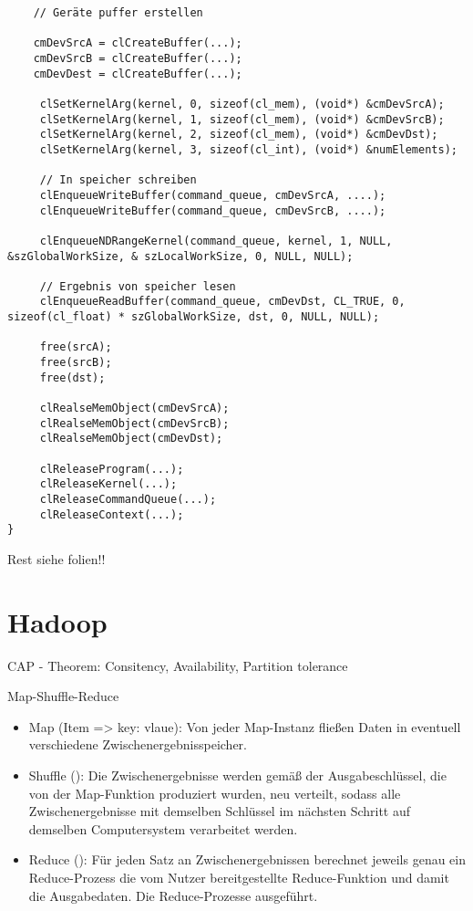 \documentclass{article}
\begin{document}
\begin{multicols}{2}
\begin{verbatim}
    // Geräte puffer erstellen
    
    cmDevSrcA = clCreateBuffer(...);
    cmDevSrcB = clCreateBuffer(...);
    cmDevDest = clCreateBuffer(...);
    
     clSetKernelArg(kernel, 0, sizeof(cl_mem), (void*) &cmDevSrcA);
     clSetKernelArg(kernel, 1, sizeof(cl_mem), (void*) &cmDevSrcB);
     clSetKernelArg(kernel, 2, sizeof(cl_mem), (void*) &cmDevDst);
     clSetKernelArg(kernel, 3, sizeof(cl_int), (void*) &numElements);
     
     // In speicher schreiben
     clEnqueueWriteBuffer(command_queue, cmDevSrcA, ....);
     clEnqueueWriteBuffer(command_queue, cmDevSrcB, ....);
     
     clEnqueueNDRangeKernel(command_queue, kernel, 1, NULL, &szGlobalWorkSize, & szLocalWorkSize, 0, NULL, NULL);
     
     // Ergebnis von speicher lesen
     clEnqueueReadBuffer(command_queue, cmDevDst, CL_TRUE, 0, sizeof(cl_float) * szGlobalWorkSize, dst, 0, NULL, NULL);
     
     free(srcA);
     free(srcB);
     free(dst);
     
     clRealseMemObject(cmDevSrcA);
     clRealseMemObject(cmDevSrcB);
     clRealseMemObject(cmDevDst);
     
     clReleaseProgram(...);
     clReleaseKernel(...);
     clReleaseCommandQueue(...);
     clReleaseContext(...);
}
\end{verbatim}

Rest siehe folien!!

\section{Hadoop}

CAP - Theorem: Consitency, Availability, Partition tolerance

Map-Shuffle-Reduce
\begin{itemize}
    \item Map (Item => key: vlaue): Von jeder Map-Instanz fließen Daten in eventuell verschiedene Zwischenergebnisspeicher.
    \item Shuffle (): Die Zwischenergebnisse werden gemäß der Ausgabeschlüssel, die von der Map-Funktion produziert wurden, neu verteilt, sodass alle
Zwischenergebnisse mit demselben Schlüssel im nächsten Schritt auf demselben Computersystem verarbeitet werden. 
    \item Reduce (): Für jeden Satz an Zwischenergebnissen berechnet jeweils genau ein Reduce-Prozess die vom Nutzer bereitgestellte Reduce-Funktion und damit die Ausgabedaten. Die Reduce-Prozesse ausgeführt.
\end{itemize}


\end{multicols}
\end{document}
